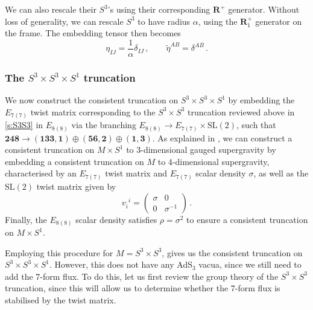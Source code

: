 \documentclass[a4paper, 11pt]{article}
\numberwithin{equation}{section}
\newcommand{\ov}[1]{\overline{#1}}
\newcommand{\SL}[1]{\mathrm{SL}( #1 )}
\newcommand{\EE}{\ensuremath{E_{8(8)}}\xspace}
\newcommand{\En}[1]{E_{#1(#1)}}
\newcommand{\+}{\oplus}
\begin{document}
We can also rescale their $S^3$'s using their corresponding $\mathbf{R}^+$ generator. Without loss of generality, we can rescale $S^3$ to have radius $\alpha$, using the $\mathbf{R}^+_1$ generator on the frame. The embedding tensor then becomes
\begin{equation}
	\eta_{IJ} = \frac{1}{\alpha} \delta_{IJ} \,, \qquad \tilde{\eta}^{AB} = \delta^{AB} \,.
\end{equation}

\subsubsection{The $S^3 \times S^3 \times S^1$ truncation} \label{s:S3S3S1}
We now construct the consistent truncation on $S^3 \times S^3 \times S^1$ by embedding the $\En{7}$ twist matrix corresponding to the $S^3 \times S^3$ truncation reviewed above in \ref{s:S3S3} in $\EE$ via the branching $\EE \rightarrow \En{7} \times \SL{2}$, such that $\mathbf{248} \rightarrow \mathbf{\left(133,1\right)} \oplus \mathbf{\left(56,2\right)} \oplus \mathbf{\left(1,3\right)}$. As explained in \cite{Galli:2022idq}, we can construct a consistent truncation on $M \times S^1$ to 3-dimensional gauged supergravity by embedding a consistent truncation on $M$ to 4-dimensional supergravity, characterised by an $\En{7}$ twist matrix and $\En{7}$ scalar density $\sigma$, as well as 
the $\SL{2}$ twist matrix given by
\begin{equation}
	v_{\ov{i}}{}^i = \begin{pmatrix}
		\sigma & 0 \\ 0 & \sigma^{-1}
	\end{pmatrix} \,.
\end{equation}
Finally, the $\EE$ scalar density satisfies $\rho = \sigma^2$ to ensure a consistent truncation on $M \times S^1$.

Employing this procedure for $M = S^3 \times S^3$, gives us the consistent truncation on $S^3 \times S^3 \times S^1$. However, this does not have any AdS$_3$ vacua, since we still need to add the 7-form flux. To do this, let us first review the group theory of the $S^3 \times S^3$ truncation, since this will allow us to determine whether the 7-form flux is stabilised by the twist matrix.
\end{document}
